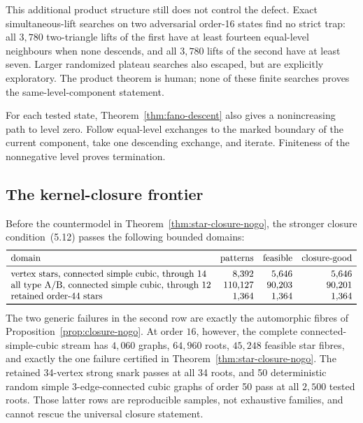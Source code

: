 \documentclass[11pt]{article}
\theoremstyle{definition}
\theoremstyle{remark}
\newcommand{\1}{\mathbf 1}
\begin{document}
This additional product structure still does not control the defect.
Exact simultaneous-lift searches on two adversarial order-16 states find
no strict trap: all \(3{,}780\) two-triangle lifts of the first have at
least fourteen equal-level neighbours when none descends, and all
\(3{,}780\) lifts of the second have at least seven.  Larger randomized
plateau searches also escaped, but are explicitly exploratory.  The
product theorem is human; none of these finite searches proves the
same-level-component statement.

For each tested state, Theorem~\ref{thm:fano-descent} also gives a
nonincreasing path to level zero.  Follow equal-level exchanges to the
marked boundary of the current component, take one descending exchange,
and iterate.  Finiteness of the nonnegative level proves termination.

\subsection{The kernel-closure frontier}

Before the countermodel in Theorem~\ref{thm:star-closure-nogo}, the stronger
closure condition~(5.12) passes the following bounded domains:
\[
\begin{array}{lrrr}
\toprule
\text{domain}&\text{patterns}&\text{feasible}&\text{closure-good}\\
\midrule
\text{vertex stars, connected simple cubic, through 14}
 &8{,}392&5{,}646&5{,}646\\
\text{all type A/B, connected simple cubic, through 12}
 &110{,}127&90{,}203&90{,}201\\
\text{retained order-44 stars}&1{,}364&1{,}364&1{,}364\\
\bottomrule
\end{array}
\]
The two generic failures in the second row are exactly the automorphic
fibres of Proposition~\ref{prop:closure-nogo}.  At order \(16\), however,
the complete connected-simple-cubic stream has \(4{,}060\) graphs,
\(64{,}960\) roots, \(45{,}248\) feasible star fibres, and exactly the one
failure certified in Theorem~\ref{thm:star-closure-nogo}.  The retained
34-vertex strong snark passes at all 34 roots, and 50 deterministic random
simple 3-edge-connected cubic graphs of order 50 pass at all \(2{,}500\)
tested roots.  Those latter rows are reproducible samples, not exhaustive
families, and cannot rescue the universal closure statement.
\end{document}
